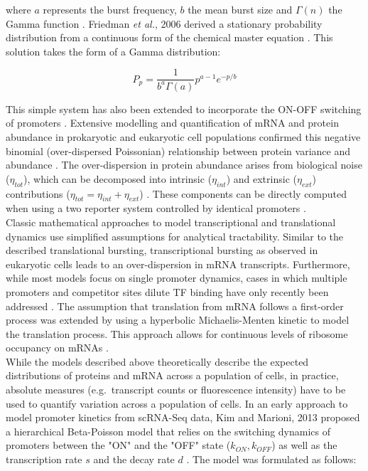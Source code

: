 \noindent where $a$ represents the burst frequency, $b$ the mean burst size and $\Gamma(n)$ the Gamma function \citep{Shahrezaei2008,Friedman2006,Tsimring2014}. 
Friedman \textit{et al.}, 2006 derived a stationary probability distribution from a continuous form of the chemical master equation \citep{Friedman2006}. 
This solution takes the form of a Gamma distribution:

\begin{equation}
P_p=\frac{1}{b^a\Gamma(a)}p^{a-1} e^{-p/b}
\end{equation}

\noindent This simple system has also been extended to incorporate the ON-OFF switching of promoters \citep{Jones2014, Shahrezaei2008}. 
Extensive modelling and quantification of mRNA and protein abundance in prokaryotic and eukaryotic cell populations confirmed this negative binomial (over-dispersed Poissonian) relationship between protein variance and abundance \citep{Ozbudak2002, Bar-Even2006}. 
The over-dispersion in protein abundance arises from biological noise ($\eta_{tot}$), which can be decomposed into intrinsic ($\eta_{int}$) and extrinsic ($\eta_{ext}$) contributions ($\eta_{tot}=\eta_{int}+\eta_{ext}$) \citep{Swain2002, Fu2016}. 
These components can be directly computed when using a two reporter system controlled by identical promoters \citep{Elowitz2002}. \\

Classic mathematical approaches to model transcriptional and translational dynamics use simplified assumptions for analytical tractability. 
Similar to the described translational bursting, transcriptional bursting as observed in eukaryotic cells \citep{Raj2006} leads to an over-dispersion in mRNA transcripts. 
Furthermore, while most models focus on single promoter dynamics, cases in which multiple promoters and competitor sites dilute TF binding have only recently been addressed \citep{Das2015a}. 
The assumption that translation from mRNA follows a first-order process was extended by using a hyperbolic Michaelis-Menten kinetic to model the translation process. 
This approach allows for continuous levels of ribosome occupancy on mRNAs \citep{VanDyken2017}. \\ 

While the models described above theoretically describe the expected distributions of proteins and mRNA across a population of cells, in practice, absolute measures (e.g.~transcript counts or fluorescence intensity) have to be used to quantify variation across a population of cells. 
In an early approach to model promoter kinetics from \gls{scRNA-Seq} data, Kim and Marioni, 2013 proposed a hierarchical Beta-Poisson model that relies on the switching dynamics of promoters between the "ON" and the "OFF" state ($k_{ON},k_{OFF}$) as well as the transcription rate $s$ and the decay rate $d$ \citep{Kim2013}. 
The model was formulated as follows:

